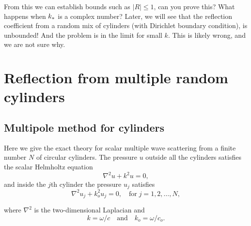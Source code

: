 \documentclass[ 12pt, a4paper]{article}
\begin{document}
From this we can establish bounds such as $|R|\leq 1$, can you prove this? What happens when $k_*$ is a complex number? Later, we will see that the reflection coefficient from a random mix of cylinders (with Dirichlet boundary condition), is unbounded! And the problem is in the limit for small $k$. This is likely wrong, and we are not sure why.


\section{Reflection from multiple random cylinders}

\subsection{Multipole method for cylinders}

Here we give the exact theory for scalar multiple wave scattering from a finite number $N$ of circular cylinders. The pressure $u$ outside all the cylinders satisfies the scalar Helmholtz equation
\begin{equation} 
\nabla^2 u + k^2 u = 0,
\end{equation}
and inside the $j$th cylinder the pressure $u_j$ satisfies
\begin{equation} 
  \nabla^2 u_j + k^2_o u_j = 0, \quad \text{for} \; j=1,2,\ldots, N,
\end{equation}

where $\nabla^2$ is the two-dimensional Laplacian and
\begin{equation}  \label{eqns:wavenumbers}
	k = \omega/c \quad \text{and} \quad k_o = \omega/c_o.
\end{equation}
\end{document}
